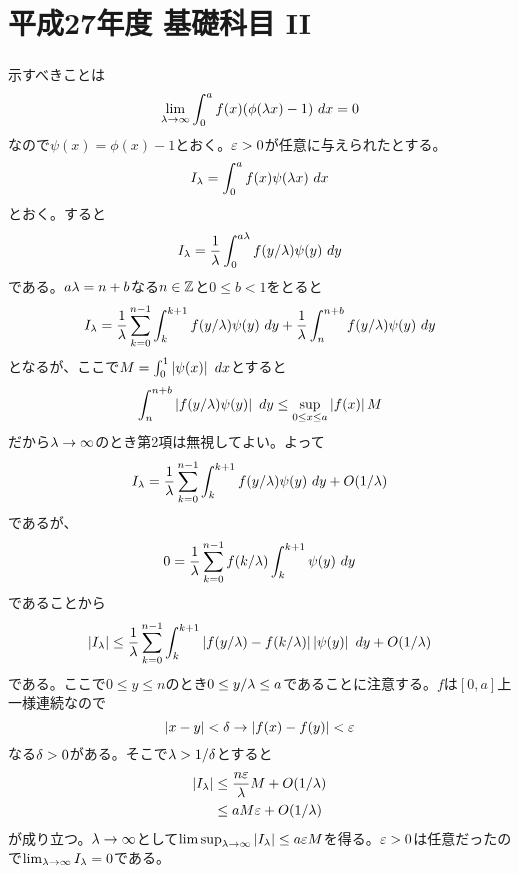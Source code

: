\section{平成27年度 基礎科目 II}

\subsubsection{}%
\barquo{
$f(x), \phi(x)$は区間$[0,\infty)$上の実数値連続関数とし、さらに$\phi(x)$は
\begin{gather*}
  \phi(x) = \phi(x+1) \quad (x \geq 0) \\
  \int_0^1 \phi(x) \ dx = 1
\end{gather*}
をみたすとする。このとき、任意の実数$a > 0$に対し
\[
\lim_{\grl \to \infty} \int_0^a f(x)\phi(\grl x) \ dx = \int_0^a f(x) \ dx
\]
が成り立つことを示せ。
}
\begin{sol}
  示すべきことは
  \[
  \lim_{{\lambda} \to \infty} \int_0^a f(x)(\phi({\lambda} x) - 1) \ dx = 0
  \]
  なので$\psi(x) = \phi(x) -1$とおく。${\varepsilon} > 0$が任意に与えられたとする。
  \[
  I_{\grl} = \int_0^a f(x)\psi(\grl x) \ dx
  \]
  とおく。すると
  \[
  I_{{\lambda}} = \frac{1}{{\lambda}}  \int_0^{a{\lambda}} f( y/ {\lambda}) \psi(y) \ dy
  \]
  である。$a{\lambda} = n + b$なる$n \in {\mathbb Z}$と$0 \leq b < 1$をとると
  \[
  I_{{\lambda}} = \frac{1}{{\lambda}}  \sum_{k=0}^{n-1}  \int_k^{k+1} f( y/ {\lambda}) \psi(y) \ dy + \frac{1}{{\lambda}}  \int_n^{n+b} f( y/ {\lambda}) \psi(y) \ dy
  \]
  となるが、ここで$M = \int_0^1 \abs{\psi(x)} \ dx$とすると
  \[
  \int_n^{n+b}  \left \lvert f( y/ {\lambda}) \psi(y)  \right \rvert  \ dy \leq \sup_{0 \leq x \leq a} \left \lvert f(x) \right \rvert M
  \]
  だから${\lambda} \to \infty$のとき第2項は無視してよい。よって
  \[
    I_{{\lambda}} = \frac{1}{{\lambda}}  \sum_{k=0}^{n-1}  \int_k^{k+1} f( y/ {\lambda}) \psi(y) \ dy + O(1/{\lambda})
  \]
  であるが、
  \[
  0 = \frac{1}{{\lambda}}\sum_{k=0}^{n-1} f(k/{\lambda}) \int_k^{k+1} \psi(y) \ dy
  \]
  であることから
  \[
  \left \lvert  I_{{\lambda}}  \right \rvert \leq  \frac{1}{{\lambda}}  \sum_{k=0}^{n-1}  \int_k^{k+1} \left \lvert f( y/ {\lambda})  - f(k/{\lambda})  \right \rvert \left \lvert \psi(y) \right \rvert \ dy + O(1/{\lambda})
  \]
  である。ここで$0 \leq y \leq n$のとき$0 \leq y/{\lambda} \leq a$であることに注意する。$f$は$[0,a]$上一様連続なので
  \[
  \left \lvert x-y \right \rvert < {\delta} \to \left \lvert f(x) - f(y) \right \rvert < {\varepsilon}
  \]
  なる${\delta} > 0$がある。そこで${\lambda} > 1/{\delta}$とすると
  \begin{align*}
    \left \lvert I_{{\lambda}} \right \rvert &\leq \frac{n {\varepsilon} }{{\lambda}} M + O(1/{\lambda}) \\
    &\leq aM{\varepsilon} + O(1/{\lambda})
  \end{align*}
  が成り立つ。${\lambda} \to \infty$として$\limsup_{{\lambda} \to \infty} \left \lvert I_{{\lambda}} \right \rvert \leq a {\varepsilon} M$を得る。${\varepsilon} > 0$は任意だったので$\lim_{{\lambda} \to \infty } I_{{\lambda}} = 0$である。
\end{sol}

